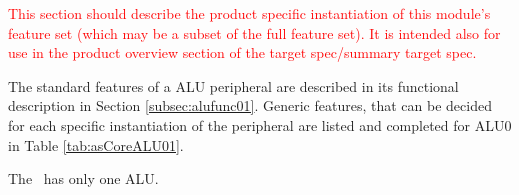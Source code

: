 \textcolor{red}{This section should describe the product specific instantiation of this module’s feature set (which may be a subset of the full feature set). It is intended also for use in the product overview section of the target spec/summary target spec.}

The standard features of a ALU peripheral are described in its functional description in Section \ref{subsec:alufunc01}. Generic features, that can be decided for each specific instantiation of the peripheral are listed and completed for ALU0 in Table \ref{tab:asCoreALU01}.

The \aschip \, has only one ALU.

